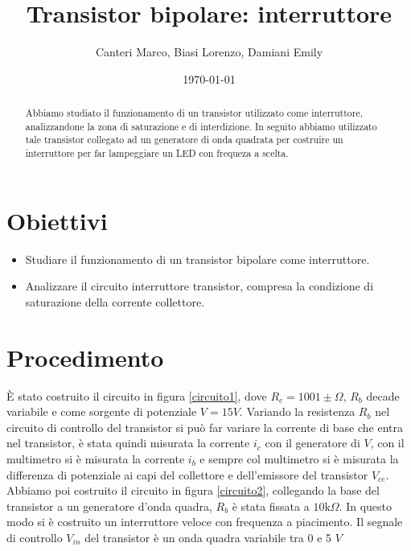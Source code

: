 \documentclass[letterpaper,11pt]{article}
\title{\textbf{Transistor bipolare:} interruttore}
\author{Canteri Marco, Biasi Lorenzo, Damiani Emily}
\date{\today}
\begin{document}
\maketitle

\begin{abstract}
\hspace{-1.5em}Abbiamo studiato il funzionamento di un transistor utilizzato come interruttore, analizzandone la zona di saturazione e di interdizione. In seguito abbiamo utilizzato tale transistor collegato ad un generatore di onda quadrata per costruire un interruttore per far lampeggiare un LED con frequeza a scelta.
\end{abstract}

\begin{body}
\section{Obiettivi}
\begin{itemize}
\item Studiare il funzionamento di un transistor bipolare come interruttore.
\item Analizzare il circuito interruttore transistor, compresa la condizione di saturazione della
corrente collettore.
\end{itemize}
\section{Procedimento}
È stato costruito il circuito in figura \eqref{circuito1}, dove $R_c = 1001 \pm \Omega$, $R_b$ decade variabile e come sorgente di potenziale $V=15 V$. Variando la resistenza $R_b$ nel circuito di controllo del transistor si può far variare la corrente di base che entra nel transistor, è stata quindi misurata la corrente $i_c$ con il generatore di $V$, con il multimetro si è misurata la corrente $i_b$ e sempre col multimetro si è misurata la differenza di potenziale ai capi del collettore e dell'emissore del transistor $V_{ce}$.
Abbiamo poi costruito il circuito in figura \eqref{circuito2}, collegando la base del transistor a un generatore d'onda quadra, $R_b$ è stata fissata a $10 \text{k}\Omega$. In questo modo si è costruito un interruttore veloce con frequenza a piacimento. Il segnale di controllo $V_{in}$ del transistor è un onda quadra variabile tra 0 e 5 $V$


\end{body}
\end{document}
